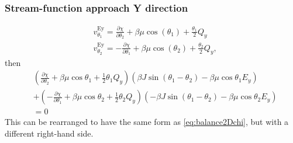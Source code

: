 \documentclass[11pt,reqno]{amsart}
\begin{document}
\subsubsection{Stream-function approach Y direction}
\begin{subequations}
\label{eq:chiDef2}
\begin{align}
&v_{\theta _1}^{\text{Ey}}=\frac{\partial \chi }{\partial \theta _2}+\beta  \mu  \cos \left(\theta _1\right)+\frac{\theta _1 \text{}}{2}Q_y\\
&v_{\theta _2}^{\text{Ey}}=-\frac{\partial \chi }{\partial \theta _1}+\beta  \mu  \cos \left(\theta _2\right)+\frac{\theta _2 \text{}}{2}Q_y,
\end{align}
\end{subequations}
then
\begin{align}
\label{eq:balance2Dchi2}
&\left(\frac{\partial \chi }{\partial \theta _2}+\beta \mu  \cos \theta _1+\frac{1}{2}\theta _1 Q_y\right)\left(\beta J \sin \left(\theta _1-\theta _2\right)-\beta \mu  \cos \theta _1 E_y \right)\nonumber\\
&+ \left(-\frac{\partial \chi }{\partial \theta _1}+\beta \mu  \cos \theta _2+\frac{1}{2}\theta _2 Q_y\right)\left(-\beta J \sin \left(\theta _1-\theta _2\right)-\beta \mu  \cos \theta _2 E_y\right)\nonumber\\
&= 0
\end{align}
This can be rearranged to have the same form as \eqref{eq:balance2Dchi}, but with a different right-hand side.
\end{document}
